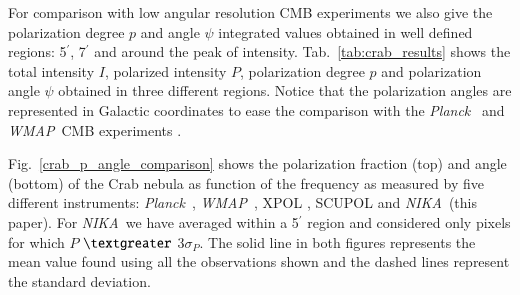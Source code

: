 \documentclass[twocolumn,traditabstract]{aa}
\def\NIKA{\textit{NIKA}}
\def\Planck{\textit{Planck}}
\def\WMAP{\textit{WMAP}}
\begin{document}
For comparison with low angular resolution CMB experiments we also give the polarization degree $p$ and angle $\psi$ integrated values obtained in well defined regions: 5$^\prime$, 7$^\prime$ and around the peak of intensity.
Tab.~\ref{tab:crab_results} shows the total intensity $I$, polarized intensity $P$, polarization degree $p$ and polarization angle $\psi$ obtained in three different regions. 
Notice that the polarization angles are represented in Galactic coordinates to ease the comparison with the \Planck\ \citep{2015arXiv150702058P} and \WMAP\ CMB experiments \citep{2011ApJS..192...19W}. 

Fig.~\ref{crab_p_angle_comparison} shows the polarization fraction (top) and angle (bottom) of the Crab nebula as function of the frequency as measured by five different instruments: \Planck\ \citep{2015arXiv150702058P}, \WMAP\ \citep{2011ApJS..192...19W}, XPOL \citep{aumont2010}, SCUPOL \citep{scubapol} and \NIKA\ (this paper).
For \NIKA\ we have averaged within a 5$^\prime$ region and considered only pixels for which $P$ $\textgreater$ $3\sigma_P$. 
The solid line in both figures represents the mean value found using all the observations shown and the dashed lines represent the standard deviation. 
\end{document}

